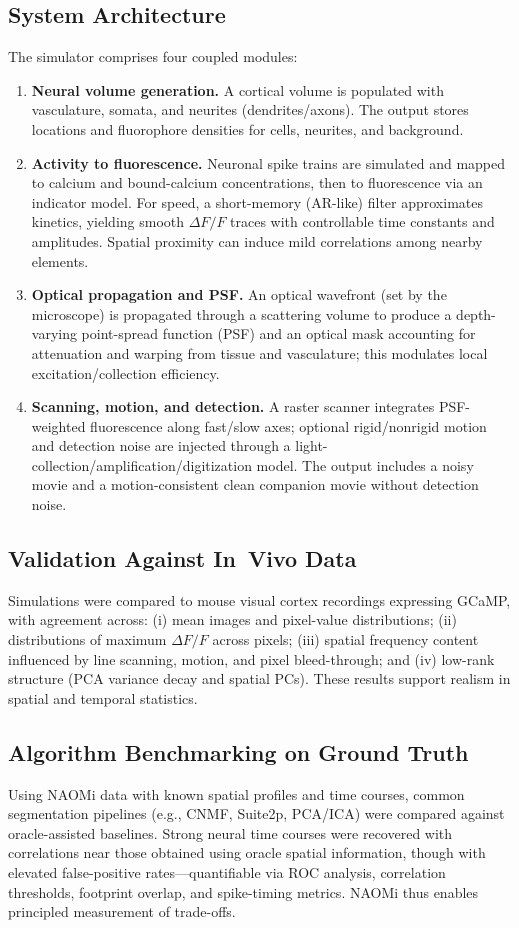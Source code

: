 \documentclass[conference]{IEEEtran}
\begin{document}
\subsection{System Architecture}
The simulator comprises four coupled modules:
\begin{enumerate}
  \item \textbf{Neural volume generation.} A cortical volume is populated with vasculature, somata, and neurites (dendrites/axons). The output stores locations and fluorophore densities for cells, neurites, and background.
  \item \textbf{Activity to fluorescence.} Neuronal spike trains are simulated and mapped to calcium and bound-calcium concentrations, then to fluorescence via an indicator model. For speed, a short-memory (AR-like) filter approximates kinetics, yielding smooth $\Delta F/F$ traces with controllable time constants and amplitudes. Spatial proximity can induce mild correlations among nearby elements.
  \item \textbf{Optical propagation and PSF.} An optical wavefront (set by the microscope) is propagated through a scattering volume to produce a depth-varying point-spread function (PSF) and an optical mask accounting for attenuation and warping from tissue and vasculature; this modulates local excitation/collection efficiency.
  \item \textbf{Scanning, motion, and detection.} A raster scanner integrates PSF-weighted fluorescence along fast/slow axes; optional rigid/nonrigid motion and detection noise are injected through a light-collection/amplification/digitization model. The output includes a noisy movie and a motion-consistent clean companion movie without detection noise.
\end{enumerate}

\subsection{Validation Against In~Vivo Data}
Simulations were compared to mouse visual cortex recordings expressing GCaMP, with agreement across: (i) mean images and pixel-value distributions; (ii) distributions of maximum $\Delta F/F$ across pixels; (iii) spatial frequency content influenced by line scanning, motion, and pixel bleed-through; and (iv) low-rank structure (PCA variance decay and spatial PCs). These results support realism in spatial and temporal statistics.

\subsection{Algorithm Benchmarking on Ground Truth}
Using NAOMi data with known spatial profiles and time courses, common segmentation pipelines (e.g., CNMF, Suite2p, PCA/ICA) were compared against oracle-assisted baselines. Strong neural time courses were recovered with correlations near those obtained using oracle spatial information, though with elevated false-positive rates---quantifiable via ROC analysis, correlation thresholds, footprint overlap, and spike-timing metrics. NAOMi thus enables principled measurement of trade-offs.
\end{document}
